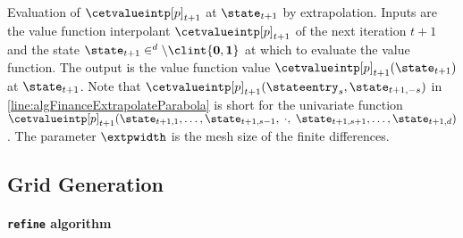 \begin{algorithm}
{    Evaluation of $\cetvalueintp[p]_{t+1}$ at $\state_{t+1}$
    by extrapolation.
    Inputs are
    the value function interpolant $\cetvalueintp[p]_{t+1}$
    of the next iteration $t + 1$ and
    the state $\state_{t+1} \in \real^d \setminus \clint{\*0, \*1}$
    at which to evaluate the value function.
    The output is
    the value function value $\cetvalueintp[p]_{t+1}(\state_{t+1})$
    at $\state_{t+1}$.
    Note that $\cetvalueintp[p]_{t+1}(\stateentry_s, \*\state_{t+1,-s})$
    in \cref{line:algFinanceExtrapolateParabola} is short for
    the univariate function $\cetvalueintp[p]_{t+1}(
      \state_{t+1,1}, \dotsc, \state_{t+1,s-1},\; {\cdot},\;
      \state_{t+1,s+1}, \dotsc, \state_{t+1,d}
    )$.
    The parameter $\extpwidth$ is the mesh size of the finite differences.%
  }%
  \label{alg:financeExtrapolate}%
\end{algorithm}



\subsection{Grid Generation}
\label{sec:826gridGeneration}

\paragraph{\texttt{refine} algorithm}



\dummytext[1]{}

\begin{algorithm}
  \begin{algorithmic}[1]
      \EndFor{}
    \EndFunction{}
  \end{algorithmic}
  \caption[TODO]{%
    TODO%
  }%
  \label{alg:financeRefine}%
\end{algorithm}

